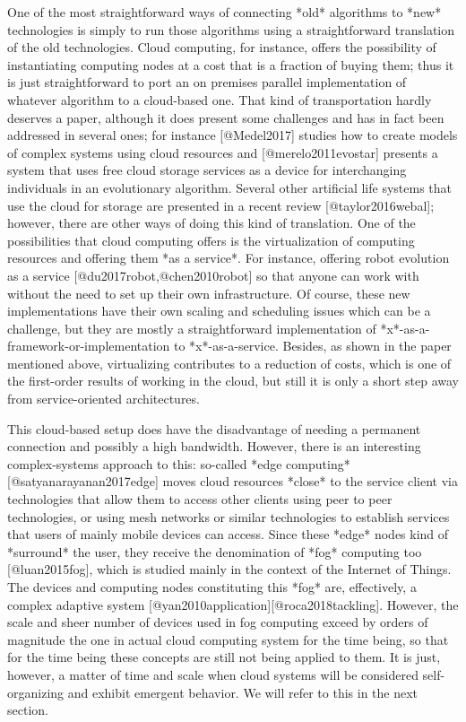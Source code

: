 \documentclass[utf8]{frontiersSCNS} %
\begin{document}
One of the most straightforward ways of connecting *old* algorithms to *new* technologies is simply to run those algorithms using a straightforward translation of the old technologies. Cloud computing, for instance, offers the possibility of instantiating computing nodes at a cost that is a fraction of buying them; thus it is just straightforward to port an on premises parallel implementation of whatever algorithm to a cloud-based one. That kind of transportation hardly deserves a paper, although it does present some challenges and has in fact been addressed in several ones; for instance [@Medel2017] studies how to create models of complex systems using cloud resources and [@merelo2011evostar] presents a system that uses free cloud storage services as a device for interchanging individuals in an evolutionary algorithm. Several other artificial life systems that use the cloud for storage are presented in a recent review [@taylor2016webal]; however, there are other ways of doing this kind of translation. One of the possibilities that cloud computing offers is the virtualization of computing resources and offering them *as a service*. For instance, offering robot evolution as a service [@du2017robot,@chen2010robot] so that anyone can work with without the need to set up their own infrastructure. Of course, these new implementations have their own scaling and scheduling issues which can be a challenge, but they are mostly a straightforward implementation of *x*-as-a-framework-or-implementation to *x*-as-a-service. Besides, as shown in the paper mentioned above, virtualizing contributes to a reduction of costs, which is one of the first-order results of working in the cloud, but still it is only a short step away from service-oriented architectures. 



This cloud-based setup does have the disadvantage of needing a permanent connection and possibly a high bandwidth. However, there is an interesting complex-systems approach to this: so-called *edge computing* [@satyanarayanan2017edge] moves cloud resources *close* to the service client via technologies that allow them to access other clients using peer to peer technologies, or using mesh networks or similar technologies to establish services that users of mainly mobile devices can access. Since these *edge* nodes kind of *surround* the user, they receive the denomination of *fog* computing too [@luan2015fog], which is studied mainly in the context of the Internet of Things. The devices and computing nodes constituting this *fog* are, effectively, a complex adaptive system [@yan2010application][@roca2018tackling]. However, the scale and sheer number of devices used in fog computing exceed by orders of magnitude the one in actual cloud computing system for the time being, so that for the time being these concepts are still not being applied to them. It is just, however, a matter of time and scale when cloud systems will be considered self-organizing and exhibit emergent behavior. We will refer to this in the next section.
\end{document}
